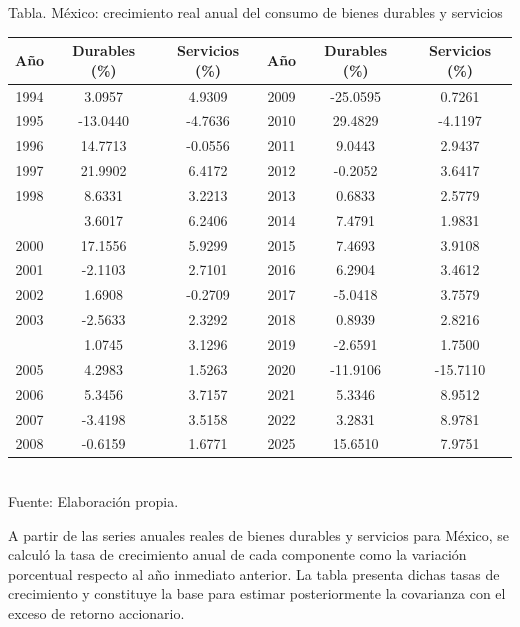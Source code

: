 \documentclass{article}\usepackage[]{graphicx}\usepackage[]{xcolor}
\begin{document}
\begin{center}
Tabla. México: crecimiento real anual del consumo de bienes durables y servicios
\end{center}
\begin{center}

\begin{tabular}{cccccc}
\toprule
Año & Durables (\%) & Servicios (\%) & Año & Durables (\%) & Servicios (\%)\\
\midrule
1994 & 3.0957 & 4.9309 & 2009 & -25.0595 & 0.7261\\
1995 & -13.0440 & -4.7636 & 2010 & 29.4829 & -4.1197\\
1996 & 14.7713 & -0.0556 & 2011 & 9.0443 & 2.9437\\
1997 & 21.9902 & 6.4172 & 2012 & -0.2052 & 3.6417\\
1998 & 8.6331 & 3.2213 & 2013 & 0.6833 & 2.5779\\
\addlinespace
1999 & 3.6017 & 6.2406 & 2014 & 7.4791 & 1.9831\\
2000 & 17.1556 & 5.9299 & 2015 & 7.4693 & 3.9108\\
2001 & -2.1103 & 2.7101 & 2016 & 6.2904 & 3.4612\\
2002 & 1.6908 & -0.2709 & 2017 & -5.0418 & 3.7579\\
2003 & -2.5633 & 2.3292 & 2018 & 0.8939 & 2.8216\\
\addlinespace
2004 & 1.0745 & 3.1296 & 2019 & -2.6591 & 1.7500\\
2005 & 4.2983 & 1.5263 & 2020 & -11.9106 & -15.7110\\
2006 & 5.3456 & 3.7157 & 2021 & 5.3346 & 8.9512\\
2007 & -3.4198 & 3.5158 & 2022 & 3.2831 & 8.9781\\
2008 & -0.6159 & 1.6771 & 2025 & 15.6510 & 7.9751\\
\bottomrule
\end{tabular}
\\[0.3em]
{\footnotesize Fuente: Elaboración propia.}
\end{center}


A partir de las series anuales reales de bienes durables y servicios para México, se calculó la tasa de crecimiento anual de cada componente como la variación porcentual respecto al año inmediato anterior. La tabla presenta dichas tasas de crecimiento y constituye la base para estimar posteriormente la covarianza con el exceso de retorno accionario.
\end{document}
